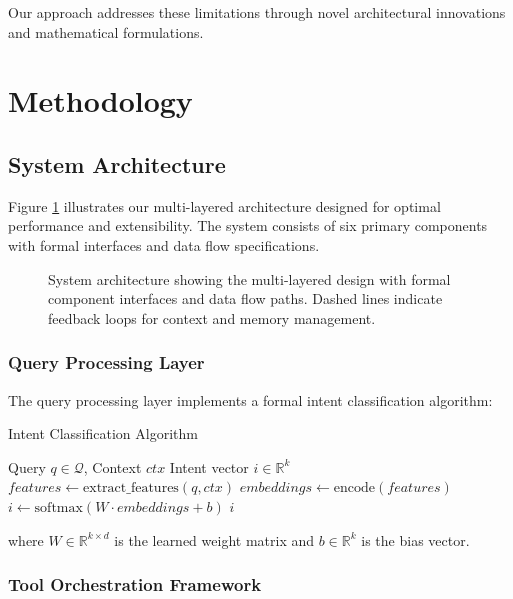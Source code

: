 \documentclass[10pt]{article}
\begin{document}
Our approach addresses these limitations through novel architectural innovations and mathematical formulations.

\section{Methodology}

\subsection{System Architecture}

Figure \ref{fig:architecture} illustrates our multi-layered architecture designed for optimal performance and extensibility. The system consists of six primary components with formal interfaces and data flow specifications.

\begin{figure}[H]
\centering

\caption{System architecture showing the multi-layered design with formal component interfaces and data flow paths. Dashed lines indicate feedback loops for context and memory management.}
\label{fig:architecture}
\end{figure}

\subsubsection{Query Processing Layer}

The query processing layer implements a formal intent classification algorithm:

\begin{algorithm}[H]
\small
\caption{Intent Classification Algorithm}
\begin{algorithmic}[1]
\REQUIRE Query $q \in \mathcal{Q}$, Context $ctx$
\ENSURE Intent vector $i \in \mathbb{R}^k$
\STATE $features \leftarrow \text{extract\_features}(q, ctx)$
\STATE $embeddings \leftarrow \text{encode}(features)$
\STATE $i \leftarrow \text{softmax}(W \cdot embeddings + b)$
\RETURN $i$
\end{algorithmic}
\end{algorithm}

where $W \in \mathbb{R}^{k \times d}$ is the learned weight matrix and $b \in \mathbb{R}^k$ is the bias vector.

\subsubsection{Tool Orchestration Framework}
\end{document}
